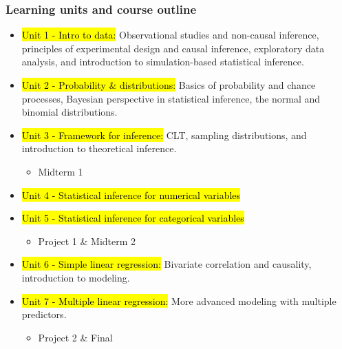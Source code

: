 \documentclass[slidestop,compress,mathserif,12pt,t,professionalfonts,xcolor=table]{beamer}
\begin{document}
\begin{frame}
\frametitle{Learning units and course outline}

{\footnotesize
\begin{itemize}[<+->]
\item \hl{Unit 1 - Intro to data:} Observational studies and non-causal inference, 
principles of experimental design and causal inference, exploratory data analysis, and 
introduction to simulation-based statistical inference.
\item \hl{Unit 2 - Probability \& distributions:} Basics of probability and chance 
processes, Bayesian perspective in statistical inference, the normal and binomial 
distributions.
\item \hl{Unit 3 - Framework for inference:} CLT, sampling distributions, and 
introduction to theoretical inference.
\begin{itemize}
\item Midterm 1
\end{itemize}
\item \hl{Unit 4 - Statistical inference for numerical variables}
\item \hl{Unit 5 - Statistical inference for categorical variables}
\begin{itemize}
\item Project 1 \& Midterm 2
\end{itemize}
\item \hl{Unit 6 - Simple linear regression:} Bivariate correlation and causality, 
introduction to modeling.
\item \hl{Unit 7 - Multiple linear regression:} More advanced modeling with multiple 
predictors.
\begin{itemize}
\item Project 2 \& Final
\end{itemize}
\end{itemize}
}


\end{frame}
\end{document}
